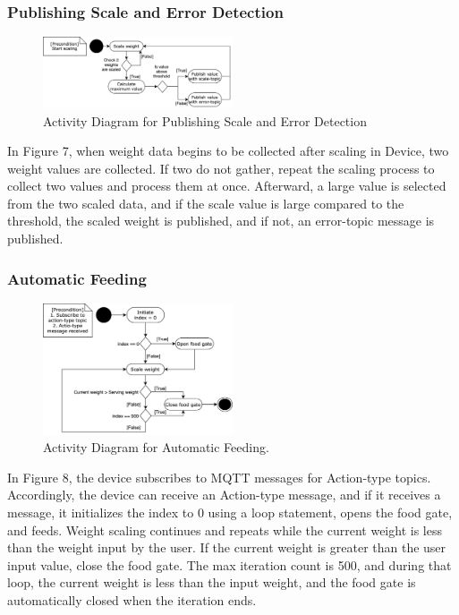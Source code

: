 \documentclass[conference]{IEEEtran}
\begin{document}
\subsubsection{Publishing Scale and Error Detection}
\begin{figure}[htbp]
\centerline{\includegraphics[width=0.5\textwidth]{./images/publishScaleError.png}}
\caption{Activity Diagram for Publishing Scale and Error Detection}
\label{fig}
\end{figure}

In Figure 7, when weight data begins to be collected after scaling in Device, two weight values are collected. If two do not gather, repeat the scaling process to collect two values and process them at once. Afterward, a large value is selected from the two scaled data, and if the scale value is large compared to the threshold, the scaled weight is published, and if not, an error-topic message is published.

\subsubsection{Automatic Feeding}
\begin{figure}[htbp]
\centerline{\includegraphics[width=0.5\textwidth]{./images/actionMessageReceived.png}}
\caption{Activity Diagram for Automatic Feeding.}
\label{fig} 
\end{figure}

In Figure 8, the device subscribes to MQTT messages for Action-type topics. Accordingly, the device can receive an Action-type message, and if it receives a message, it initializes the index to 0 using a loop statement, opens the food gate, and feeds. Weight scaling continues and repeats while the current weight is less than the weight input by the user. If the current weight is greater than the user input value, close the food gate. The max iteration count is 500, and during that loop, the current weight is less than the input weight, and the food gate is automatically closed when the iteration ends.
\end{document}
